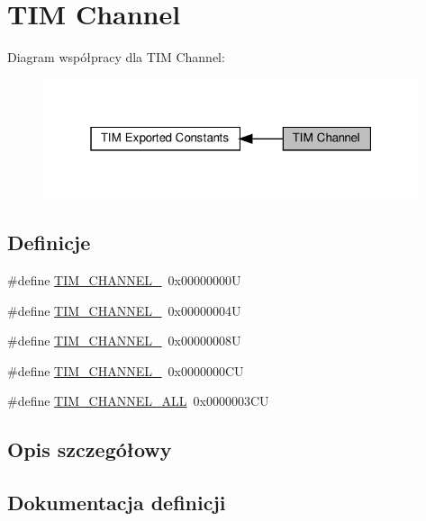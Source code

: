 \hypertarget{group___t_i_m___channel}{}\section{T\+IM Channel}
\label{group___t_i_m___channel}
Diagram współpracy dla T\+IM Channel\+:\nopagebreak
\begin{figure}[H]
\begin{center}
\leavevmode
\includegraphics[width=313pt]{group___t_i_m___channel}
\end{center}
\end{figure}
\subsection*{Definicje}
\begin{DoxyCompactItemize}
\item 
\#define \hyperlink{group___t_i_m___channel_ga6b1541e4a49d62610899e24bf23f4879}{T\+I\+M\+\_\+\+C\+H\+A\+N\+N\+E\+L\+\_}~0x00000000U
\item 
\#define \hyperlink{group___t_i_m___channel_ga33e02d43345a7ac5886f01b39e4f7ccd}{T\+I\+M\+\_\+\+C\+H\+A\+N\+N\+E\+L\+\_}~0x00000004U
\item 
\#define \hyperlink{group___t_i_m___channel_ga4ea100c1789b178f3cb46721b7257e2d}{T\+I\+M\+\_\+\+C\+H\+A\+N\+N\+E\+L\+\_}~0x00000008U
\item 
\#define \hyperlink{group___t_i_m___channel_gad59ef74820ee8bf77fa1f8d589fde2ac}{T\+I\+M\+\_\+\+C\+H\+A\+N\+N\+E\+L\+\_}~0x0000000\+CU
\item 
\#define \hyperlink{group___t_i_m___channel_ga6abf8f9fc695b79d8781ca082dfb48bc}{T\+I\+M\+\_\+\+C\+H\+A\+N\+N\+E\+L\+\_\+\+A\+LL}~0x0000003\+CU
\end{DoxyCompactItemize}


\subsection{Opis szczegółowy}


\subsection{Dokumentacja definicji}
\mbox{\label{group___t_i_m___channel_ga6b1541e4a49d62610899e24bf23f4879}} 
